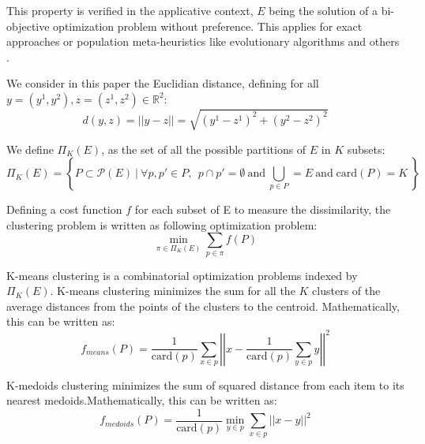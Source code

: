 \documentclass{meta}
\def\RR{{\mathbb{R}}}
\def\PP{{\mathcal{P}}}
\begin{document}
This property  is verified in the applicative context, $E$ being the solution of a bi-objective optimization problem without preference.
This applies for 
exact approaches or population meta-heuristics like evolutionary algorithms and others \cite{talbi2012multi}.



We consider in this paper the Euclidian distance, defining for all $ y=(y^1,y^2),z=(z^1,z^2) \in \RR^2$: 
\begin{equation}
d(y,z) = |\!| y -z |\!| = \sqrt{ \left(y^1 - z^1\right)^2 + \left(y^2 - z^2\right)^2}
\end{equation}



We define  $\Pi_K(E)$, as the set of all the possible partitions of $E$ in $K$ subsets:
\begin{equation}
\Pi_K(E) = \left\{P \subset \PP(E)\: \bigg| \:\forall p,p' \in P, \:\:p \cap p' =  \emptyset \: \mbox{and} \: \bigcup_{p \in P} = E \: \mbox{and} \; \mbox{card}(P)=K \: \right\} 
\end{equation}

Defining a cost function $f$ for each subset of E to measure the dissimilarity, the clustering problem is written as following optimization problem:
\begin{equation}\label{defK}
\min_{\pi \in \Pi_K(E)}  
\sum_{p \in \pi}  f(P)
\end{equation}

K-means clustering  is a combinatorial optimization problems indexed by $\Pi_K(E)$.
K-means clustering minimizes the sum for all the $K$ clusters of the average distances from the points of the clusters to the centroid.
Mathematically, this can be written as:
\begin{equation}\label{defKmeans}
f_{means}(P) =  \frac 1 {\mbox{card}(p)}
 \sum_{x \in p} \left|\!\left| x - \frac 1 {\mbox{card}(p)} \sum_{y \in p} y \right|\!\right|^2
\end{equation}

K-medoids clustering minimizes the sum of squared distance from each item to its nearest medoids.Mathematically, this can be written as:
\begin{equation}\label{defKedoids}
f_{medoids}(P) =  \frac 1 {\mbox{card}(p)}\min_{y \in p} 
\sum_{x \in p} \left|\!\left| x - y \right|\!\right|^2
\end{equation}
\end{document}
